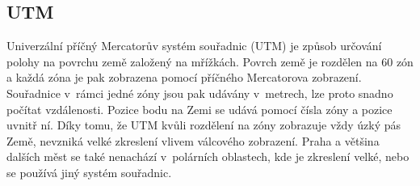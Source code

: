 \subsection{UTM}
Univerzální příčný Mercatorův systém souřadnic (UTM) \cite{UTM} je způsob
určování polohy na povrchu země založený na mřížkách. Povrch země je rozdělen na
60 zón a každá zóna je pak zobrazena pomocí příčného Mercatorova
zobrazení. Souřadnice v~rámci jedné zóny jsou pak udávány v~metrech, lze proto
snadno počítat vzdálenosti. Pozice bodu na Zemi se udává pomocí čísla zóny a
pozice uvnitř ní. Díky tomu, že UTM kvůli rozdělení na zóny zobrazuje vždy úzký
pás Země, nevzniká velké zkreslení vlivem válcového zobrazení. Praha a většina
dalších měst se také nenachází v~polárních oblastech, kde je zkreslení velké,
nebo se používá jiný systém souřadnic.

